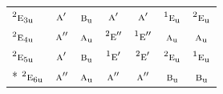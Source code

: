 \documentclass[10pt,a4paper]{article}
\numberwithin{equation}{section}
\newcommand{\irr}[1]{\text{\normalfont\scshape #1}}
\newcommand{\conjpair}[1]{{}^{#1}}
\newcommand{\ptag}[1]{\mathrm{#1}}
\begin{document}
{\begin{longtable}{@{}lcccccc@{}}
$\conjpair{2}\irr{e}_{3\ptag{u}}$ & $\irr{a}'$ & $\irr{b}_{\ptag{u}}$ & $\irr{a}'$ & $\irr{a}'$ & $\conjpair{1}\irr{e}_{\ptag{u}}$ & $\conjpair{2}\irr{e}_{\ptag{u}}$\\
$\conjpair{2}\irr{e}_{4\ptag{u}}$ & $\irr{a}''$ & $\irr{a}_{\ptag{u}}$ & $\conjpair{2}\irr{e}''$ & $\conjpair{1}\irr{e}''$ & $\irr{a}_{\ptag{u}}$ & $\irr{a}_{\ptag{u}}$\\
$\conjpair{2}\irr{e}_{5\ptag{u}}$ & $\irr{a}'$ & $\irr{b}_{\ptag{u}}$ & $\conjpair{1}\irr{e}'$ & $\conjpair{2}\irr{e}'$ & $\conjpair{2}\irr{e}_{\ptag{u}}$ & $\conjpair{1}\irr{e}_{\ptag{u}}$\\*
$\conjpair{2}\irr{e}_{6\ptag{u}}$ & $\irr{a}''$ & $\irr{a}_{\ptag{u}}$ & $\irr{a}''$ & $\irr{a}''$ & $\irr{b}_{\ptag{u}}$ & $\irr{b}_{\ptag{u}}$\\
\bottomrule\end{longtable}}
\end{document}
